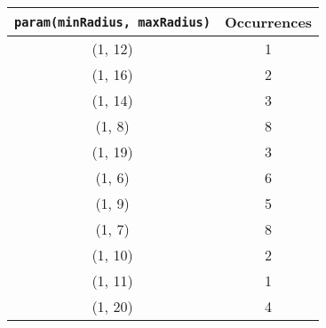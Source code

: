 \documentclass[letterpaper, 12pt]{article}
\begin{document}
\begin{longtable}{|c|c|}
\hline
\textbf{\texttt{param(minRadius, maxRadius)}} & \textbf{Occurrences} \\
\hline
(1, 12) & 1 \\
\hline
(1, 16) & 2 \\
\hline
(1, 14) & 3 \\
\hline
(1, 8) & 8 \\
\hline
(1, 19) & 3 \\
\hline
(1, 6) & 6 \\
\hline
(1, 9) & 5 \\
\hline
(1, 7) & 8 \\
\hline
(1, 10) & 2 \\
\hline
(1, 11) & 1 \\
\hline
(1, 20) & 4 \\
\hline
\end{longtable}
\end{document}
